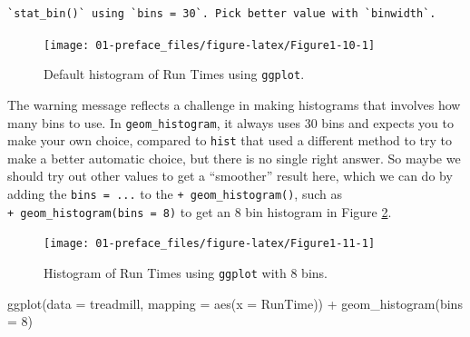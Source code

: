 \documentclass[
]{book}
\newenvironment{Shaded}{\begin{snugshade}}{\end{snugshade}}
\newcommand{\AttributeTok}[1]{\textcolor[rgb]{0.77,0.63,0.00}{#1}}
\newcommand{\DecValTok}[1]{\textcolor[rgb]{0.00,0.00,0.81}{#1}}
\newcommand{\FunctionTok}[1]{\textcolor[rgb]{0.00,0.00,0.00}{#1}}
\newcommand{\NormalTok}[1]{#1}
\newcommand{\SpecialCharTok}[1]{\textcolor[rgb]{0.00,0.00,0.00}{#1}}
\begin{document}
\begin{verbatim}
`stat_bin()` using `bins = 30`. Pick better value with `binwidth`.
\end{verbatim}

\begin{figure}[ht!]

{\centering \texttt{[image: 01-preface\_files/figure-latex/Figure1-10-1]} 

}

\caption{Default histogram of Run Times using \texttt{ggplot}.}\label{fig:Figure1-10}
\end{figure}

\newpage

The warning message reflects a challenge in making histograms that involves how
many bins to use. In \texttt{geom\_histogram}, it always uses 30 bins and expects you to
make your own choice, compared to \texttt{hist} that used a different method to try to
make a better automatic choice, but there is no single right answer. So maybe we
should try out other values to get a ``smoother'' result here, which we can do by
adding the \texttt{bins\ =\ ...} to the \texttt{+\ geom\_histogram()}, such as
\texttt{+\ geom\_histogram(bins\ =\ 8)} to get an 8 bin histogram in
Figure \ref{fig:Figure1-11}.



\begin{figure}[ht!]

{\centering \texttt{[image: 01-preface\_files/figure-latex/Figure1-11-1]} 

}

\caption{Histogram of Run Times using \texttt{ggplot} with 8 bins.}\label{fig:Figure1-11}
\end{figure}

\begin{Shaded}
\begin{Highlighting}[]
\FunctionTok{ggplot}\NormalTok{(}\AttributeTok{data =}\NormalTok{ treadmill, }\AttributeTok{mapping =} \FunctionTok{aes}\NormalTok{(}\AttributeTok{x =}\NormalTok{ RunTime)) }\SpecialCharTok{+} 
  \FunctionTok{geom\_histogram}\NormalTok{(}\AttributeTok{bins =} \DecValTok{8}\NormalTok{)}
\end{Highlighting}
\end{Shaded}

\newpage
\end{document}
